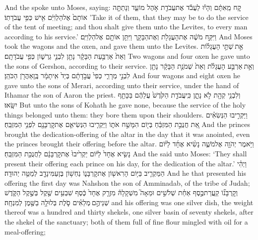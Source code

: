 \documentclass[11pt, openany]{book}
\begin{document}
{And the \lord\space spoke unto Moses, saying:}
{קַ֚ח מֵֽאִתָּ֔ם וְהָי֕וּ לַעֲבֹ֕ד אֶת\maqqaf עֲבֹדַ֖ת אֹ֣הֶל מוֹעֵ֑ד וְנָתַתָּ֤ה אוֹתָם֙ אֶל\maqqaf הַלְוִיִּ֔ם אִ֖ישׁ כְּפִ֥י עֲבֹדָתֽוֹ׃}
{’Take it of them, that they may be to do the service of the tent of meeting; and thou shalt give them unto the Levites, to every man according to his service.’}
{וַיִּקַּ֣ח מֹשֶׁ֔ה אֶת\maqqaf הָעֲגָלֹ֖ת וְאֶת\maqqaf הַבָּקָ֑ר וַיִּתֵּ֥ן אוֹתָ֖ם אֶל\maqqaf הַלְוִיִּֽם׃}
{And Moses took the wagons and the oxen, and gave them unto the Levites.}
{אֵ֣ת \legarmeh  שְׁתֵּ֣י הָעֲגָל֗וֹת וְאֵת֙ אַרְבַּ֣עַת הַבָּקָ֔ר נָתַ֖ן לִבְנֵ֣י גֵרְשׁ֑וֹן כְּפִ֖י עֲבֹדָתָֽם׃}
{Two wagons and four oxen he gave unto the sons of Gershon, according to their service.}
{וְאֵ֣ת \legarmeh  אַרְבַּ֣ע הָעֲגָלֹ֗ת וְאֵת֙ שְׁמֹנַ֣ת הַבָּקָ֔ר נָתַ֖ן לִבְנֵ֣י מְרָרִ֑י כְּפִי֙ עֲבֹ֣דָתָ֔ם בְּיַד֙ אִֽיתָמָ֔ר בֶּֽן\maqqaf אַהֲרֹ֖ן הַכֹּהֵֽן׃}
{And four wagons and eight oxen he gave unto the sons of Merari, according unto their service, under the hand of Ithamar the son of Aaron the priest.}
{וְלִבְנֵ֥י קְהָ֖ת לֹ֣א נָתָ֑ן כִּֽי\maqqaf עֲבֹדַ֤ת הַקֹּ֙דֶשׁ֙ עֲלֵהֶ֔ם בַּכָּתֵ֖ף יִשָּֽׂאוּ׃}
{But unto the sons of Kohath he gave none, because the service of the holy things belonged unto them: they bore them upon their shoulders.}
{וַיַּקְרִ֣יבוּ הַנְּשִׂאִ֗ים אֵ֚ת חֲנֻכַּ֣ת הַמִּזְבֵּ֔חַ בְּי֖וֹם הִמָּשַׁ֣ח אֹת֑וֹ וַיַּקְרִ֧יבוּ הַנְּשִׂיאִ֛ם אֶת\maqqaf קׇרְבָּנָ֖ם לִפְנֵ֥י הַמִּזְבֵּֽחַ׃}
{And the princes brought the dedication-offering of the altar in the day that it was anointed, even the princes brought their offering before the altar.}
{וַיֹּ֥אמֶר יְהֹוָ֖ה אֶל\maqqaf מֹשֶׁ֑ה נָשִׂ֨יא אֶחָ֜ד לַיּ֗וֹם נָשִׂ֤יא אֶחָד֙ לַיּ֔וֹם יַקְרִ֙יבוּ֙ אֶת\maqqaf קׇרְבָּנָ֔ם לַחֲנֻכַּ֖ת הַמִּזְבֵּֽחַ׃ \setuma }
{And the \lord\space said unto Moses: ‘They shall present their offering each prince on his day, for the dedication of the altar.’}
{וַיְהִ֗י הַמַּקְרִ֛יב בַּיּ֥וֹם הָרִאשׁ֖וֹן אֶת\maqqaf קׇרְבָּנ֑וֹ נַחְשׁ֥וֹן בֶּן\maqqaf עַמִּינָדָ֖ב לְמַטֵּ֥ה יְהוּדָֽה׃}
{And he that presented his offering the first day was Nahshon the son of Amminadab, of the tribe of Judah;}
{וְקׇרְבָּנ֞וֹ קַֽעֲרַת\maqqaf כֶּ֣סֶף אַחַ֗ת שְׁלֹשִׁ֣ים וּמֵאָה֮ מִשְׁקָלָהּ֒ מִזְרָ֤ק אֶחָד֙ כֶּ֔סֶף שִׁבְעִ֥ים שֶׁ֖קֶל בְּשֶׁ֣קֶל הַקֹּ֑דֶשׁ שְׁנֵיהֶ֣ם \legarmeh  מְלֵאִ֗ים סֹ֛לֶת בְּלוּלָ֥ה בַשֶּׁ֖מֶן לְמִנְחָֽה׃}
{and his offering was one silver dish, the weight thereof was a hundred and thirty shekels, one silver basin of seventy shekels, after the shekel of the sanctuary; both of them full of fine flour mingled with oil for a meal-offering;}
\end{document}
